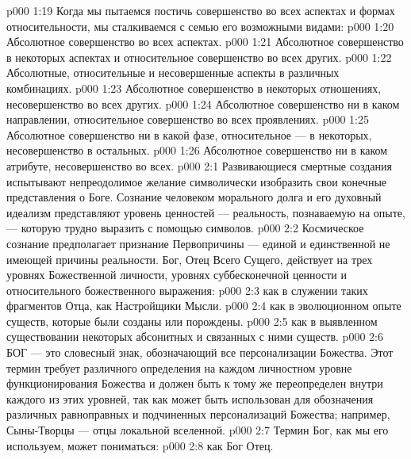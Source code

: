 \vs p000 1:19 \pc Когда мы пытаемся постичь совершенство во всех аспектах и формах относительности, мы сталкиваемся с семью его возможными видами:
\vs p000 1:20 \bibnobreakspace Абсолютное совершенство во всех аспектах.
\vs p000 1:21 \bibnobreakspace Абсолютное совершенство в некоторых аспектах и относительное совершенство во всех других.
\vs p000 1:22 \bibnobreakspace Абсолютные, относительные и несовершенные аспекты в различных комбинациях.
\vs p000 1:23 \bibnobreakspace Абсолютное совершенство в некоторых отношениях, несовершенство во всех других.
\vs p000 1:24 \bibnobreakspace Абсолютное совершенство ни в каком направлении, относительное совершенство во всех проявлениях.
\vs p000 1:25 \bibnobreakspace Абсолютное совершенство ни в какой фазе, относительное --- в некоторых, несовершенство в остальных.
\vs p000 1:26 \bibnobreakspace Абсолютное совершенство ни в каком атрибуте, несовершенство во всех.
\vs p000 2:1 Развивающиеся смертные создания испытывают непреодолимое желание символически изобразить свои конечные представления о Боге. Сознание человеком морального долга и его духовный идеализм представляют уровень ценностей --- реальность, познаваемую на опыте, --- которую трудно выразить с помощью символов.
\vs p000 2:2 Космическое сознание предполагает признание Первопричины --- единой и единственной не имеющей причины реальности. Бог, Отец Всего Сущего, действует на трех уровнях Божественной личности, уровнях суббесконечной ценности и относительного божественного выражения:
\vs p000 2:3 \bibnobreakspace {} как в служении таких фрагментов Отца, как Настройщики Мысли.
\vs p000 2:4 \bibnobreakspace {} как в эволюционном опыте существ, которые были созданы или порождены.
\vs p000 2:5 \bibnobreakspace {} как в выявленном существовании некоторых абсонитных и связанных с ними существ.
\vs p000 2:6 БОГ --- это словесный знак, обозначающий все персонализации Божества. Этот термин требует различного определения на каждом личностном уровне функционирования Божества и должен быть к тому же переопределен внутри каждого из этих уровней, так как может быть использован для обозначения различных равноправных и подчиненных персонализаций Божества; например, Сыны\hyp{}Творцы --- отцы локальной вселенной.
\vs p000 2:7 \pc Термин Бог, как мы его используем, может пониматься:
\vs p000 2:8  как Бог Отец.
